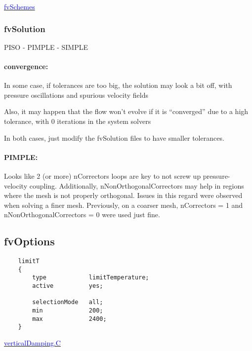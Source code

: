 \documentclass[a4paper, 12pt]{article}
\numberwithin{equation}{section}
\newcommand{\code}{\fontfamily{pcr}\selectfont}
\newcommand{\blue}[1]{\textcolor{blue}{#1}}
\begin{document}
        \href{https://www.wolfdynamics.com/training/introOF8/supplement_tipsandtricks.pdf}{\blue{fvSchemes}}

    \subsubsection{fvSolution}

        PISO - PIMPLE - SIMPLE

        \paragraph{convergence:\\}
            In some case, if tolerances are too big, the solution may look a bit off, with pressure oscillations and spurious velocity fields

            Also, it may happen that the flow won't evolve if it is ``converged'' due to a high tolerance, with 0 iterations in the system solvers

            In both cases, just modify the {\code fvSolution} files to have smaller tolerances.

        \paragraph{PIMPLE:\\}

            Looks like 2 (or more) {\code nCorrectors} loops are key to not screw up pressure-velocity coupling. Additionally, {\code nNonOrthogonalCorrectors} may help in regions where the mesh is not properly orthogonal. Issues in this regard were observed when solving a finer mesh. Previously, on a coarser mesh, {\code nCorrectors = 1} and {\code nNonOrthogonalCorrectors = 0} were used just fine.

    \subsection{fvOptions}

    {
    \begin{verbatim}
    limitT
    {
        type            limitTemperature;
        active          yes;

        selectionMode   all;
        min             200;
        max             2400;
    }
    \end{verbatim}
    }

    \href{
    https://github.com/OpenFOAM/OpenFOAM-12/blob/master/src/waves/fvModels/verticalDamping/verticalDamping.C
    }{\blue{verticalDamping.C}}
\end{document}
